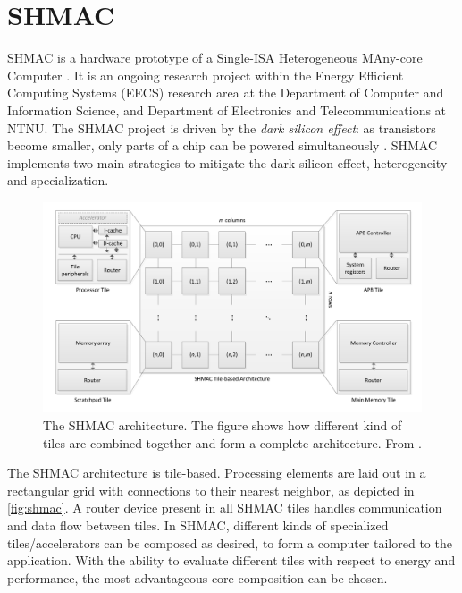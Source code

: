 \section{SHMAC}

SHMAC is a hardware prototype of a Single-ISA Heterogeneous MAny-core Computer
\cite{shmacsliedes, shmacwebpage, Rusten567042}. It is an ongoing research
project within the Energy Efficient Computing Systems (EECS) research area at
the Department of Computer and Information Science, and Department of
Electronics and Telecommunications at NTNU. The SHMAC project is driven by the
\textit{dark silicon effect}: as transistors become smaller, only parts of a
chip can be powered simultaneously \cite{esmaeilzadeh2011dark}. SHMAC implements
two main strategies to mitigate the dark silicon effect, heterogeneity and
specialization.

\begin{figure}
    \centering
    \includegraphics[width=1.0\textwidth]{figs/shmac-high-level2.png}
    \caption{The SHMAC architecture. The figure shows how different kind of
        tiles are combined together and form a complete architecture. From
        \cite{shmacwebpage}.}
    \label{fig:shmac}
\end{figure}

The SHMAC architecture is tile-based. Processing elements are laid out in a
rectangular grid with connections to their nearest neighbor, as depicted in
\autoref{fig:shmac}. A router device present in all SHMAC tiles handles
communication and data flow between tiles. In SHMAC, different kinds of
specialized tiles/accelerators can be composed as desired, to form a computer
tailored to the application. With the ability to evaluate different tiles with
respect to energy and performance, the most advantageous core composition can be
chosen.
